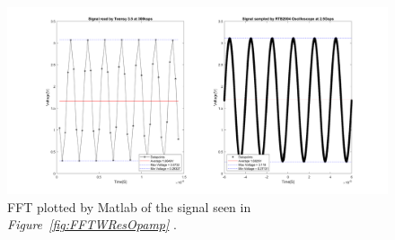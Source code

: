 \begin{figure}[h]
    \centering
    \includegraphics[width=1.0\textwidth]{graphics/MeasurWResOpAmp.png}
    \caption{FFT plotted by Matlab of the signal seen in \textit{Figure~\ref{fig:FFTWResOpamp} }.}
    \label{fig:MeasurWResOpAmp}
\end{figure}




